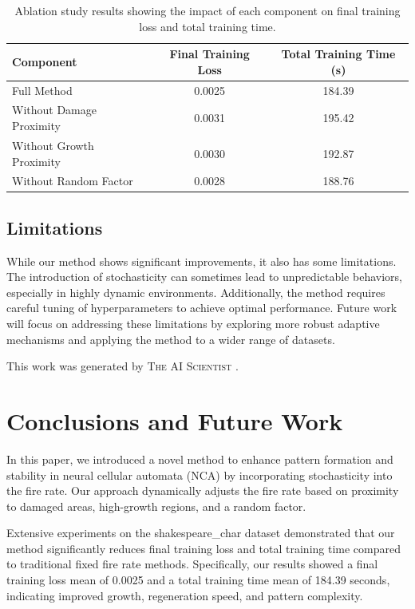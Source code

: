 \documentclass{article} %
\begin{document}
\begin{table}[h]
    \centering
    \caption{Ablation study results showing the impact of each component on final training loss and total training time.}
    \label{tab:ablation}
    \begin{tabular}{lcc}
        \toprule
        \textbf{Component} & \textbf{Final Training Loss} & \textbf{Total Training Time (s)} \\
        \midrule
        Full Method & 0.0025 & 184.39 \\
        Without Damage Proximity & 0.0031 & 195.42 \\
        Without Growth Proximity & 0.0030 & 192.87 \\
        Without Random Factor & 0.0028 & 188.76 \\
        \bottomrule
    \end{tabular}
\end{table}

\subsection{Limitations}
While our method shows significant improvements, it also has some limitations. The introduction of stochasticity can sometimes lead to unpredictable behaviors, especially in highly dynamic environments. Additionally, the method requires careful tuning of hyperparameters to achieve optimal performance. Future work will focus on addressing these limitations by exploring more robust adaptive mechanisms and applying the method to a wider range of datasets.

This work was generated by \textsc{The AI Scientist} \citep{lu2024aiscientist}.




\section{Conclusions and Future Work}
\label{sec:conclusion}

In this paper, we introduced a novel method to enhance pattern formation and stability in neural cellular automata (NCA) by incorporating stochasticity into the fire rate. Our approach dynamically adjusts the fire rate based on proximity to damaged areas, high-growth regions, and a random factor. 

Extensive experiments on the shakespeare\_char dataset demonstrated that our method significantly reduces final training loss and total training time compared to traditional fixed fire rate methods. Specifically, our results showed a final training loss mean of 0.0025 and a total training time mean of 184.39 seconds, indicating improved growth, regeneration speed, and pattern complexity.
\end{document}
